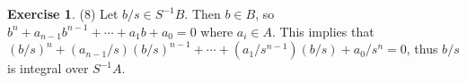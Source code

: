 \documentclass[12pt, psamsfonts]{amsart}
\theoremstyle{definition}
\newtheorem*{exer}{Exercise}
\theoremstyle{remark}
\numberwithin{equation}{section}
\begin{document}
\begin{exer}{(8)}
  Let $b / s \in S^{-1}B$.
  Then $b \in B$, so $b^n + a_{n - 1}b^{n - 1} + \cdots + a_1b + a_0 = 0$ where $a_i \in A$.
  This implies that $(b / s)^n + (a_{n - 1} / s)(b / s)^{n - 1} + \cdots + (a_1 / s^{n - 1})(b / s) + a_0 / s^n = 0$, thus $b / s$ is integral over $S^{-1}A$.
\end{exer}
\end{document}
